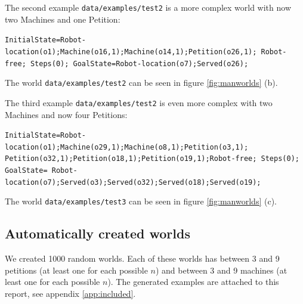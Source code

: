 The second example \texttt{data/examples/test2} is a more complex world with now two Machines and one Petition:

\texttt{InitialState=Robot-location(o1);Machine(o16,1);Machine(o14,1);Petition(o26,1); Robot-free; Steps(0);
GoalState=Robot-location(o7);Served(o26);}

The world \texttt{data/examples/test2} can be seen in figure \ref{fig:manworlds} (b).

The third example \texttt{data/examples/test2} is even more complex  with two Machines and now four Petitions:

\texttt{InitialState=Robot-location(o1);Machine(o29,1);Machine(o8,1);Petition(o3,1); Petition(o32,1);Petition(o18,1);Petition(o19,1);Robot-free; Steps(0); 
GoalState= Robot-location(o7);Served(o3);Served(o32);Served(o18);Served(o19);}

The world \texttt{data/examples/test3} can be seen in figure \ref{fig:manworlds} (c).


\subsection{Automatically created worlds}

We created 1000 random worlds. Each of these worlds has between 3 and 9 petitions (at least one for each possible $n$) and between 3 and 9 machines (at least one for each possible $n$). The generated examples are attached to this report, see appendix \ref{app:included}.